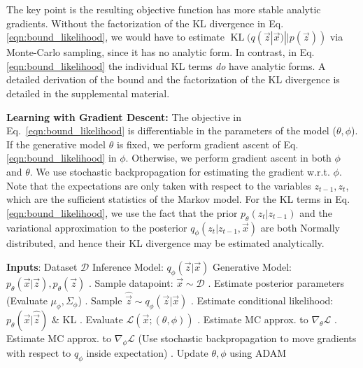 \documentclass[letterpaper]{article}
\DeclareMathOperator{\KL}{KL}
\newcommand{\pth}{p_\theta}
\newcommand{\qph}{q_\phi}
\newcommand{\vecx}{\vec{x}}
\newcommand{\vecz}{\vec{z}}
\newcommand{\lthph}{\mathcal{L}(\vecx;(\theta, \phi))}
\theoremstyle{plain}
\newcommand{\citep}{\cite}
\newcommand{\DMM}{DMM\xspace}
\begin{document}
The key point is the resulting objective function has more stable analytic gradients.
Without the factorization of the KL divergence in Eq. \ref{eqn:bound_likelihood}, 
we would have to estimate $\KL(q(\vec{z}|\vec{x})||p(\vec{z}))$ via
Monte-Carlo sampling, since it has no analytic form. In contrast, in Eq. \ref{eqn:bound_likelihood} 
the individual KL terms \emph{do} have analytic forms.
A detailed derivation of the bound and the factorization of the KL divergence is detailed in the supplemental material.

\textbf{Learning with Gradient Descent:} 
The objective in Eq.~\ref{eqn:bound_likelihood} is differentiable
in the parameters of the model ($\theta,\phi$).
If the generative model $\theta$ is fixed, we perform gradient ascent of Eq. \ref{eqn:bound_likelihood}
in $\phi$. Otherwise, we perform gradient ascent in both $\phi$ and $\theta$.
We use stochastic backpropagation \cite{kingma2013auto,rezende2014stochastic} 
for estimating the gradient w.r.t. $\phi$. 
Note that the expectations are only taken with respect to the variables $z_{t-1}, z_t$, which are the sufficient statistics of the Markov model. 
For the KL terms in Eq. \ref{eqn:bound_likelihood}, we use the fact that the prior $\pth(z_t|z_{t-1})$ and the
variational approximation to the posterior
$\qph(z_t|z_{t-1},\vecx)$ are both Normally distributed, and
hence their KL divergence may be estimated analytically.

\begin{algorithm}[h]
\caption{\small \textbf{Learning a \DMM with stochastic gradient descent: } 
	We use a single sample from the recognition network during learning to evaluate expectations in the bound. 
We aggregate gradients across mini-batches.}
\begin{algorithmic} \label{alg1}
	\STATE \textbf{Inputs}: Dataset $\mathcal{D}$
\STATE \qquad\quad\; Inference Model: $\qph(\vecz|\vecx)$
\STATE \qquad\quad\; Generative Model: $\pth(\vecx|\vecz), \pth(\vecz)$
. Sample datapoint: $\vecx\sim\mathcal{D}$
. Estimate posterior parameters (Evaluate $\mu_\phi, \Sigma_\phi$)
. Sample $\hat{\vecz}\sim \qph(\vecz|\vecx)$
. Estimate conditional likelihood: $\pth(\vecx|\hat{\vecz})$ \& KL
. Evaluate $\lthph$ 
. Estimate MC approx. to $\nabla_{\theta}\mathcal{L}$ 
. Estimate MC approx. to $\nabla_{\phi}\mathcal{L}$ 
\STATE (Use stochastic backpropagation to move gradients with respect to $\qph$ inside expectation)
. Update $\theta,\phi$ using ADAM \citep{kingma2014adam} 
\ENDWHILE 
\end{algorithmic}
\end{algorithm}
\end{document}
